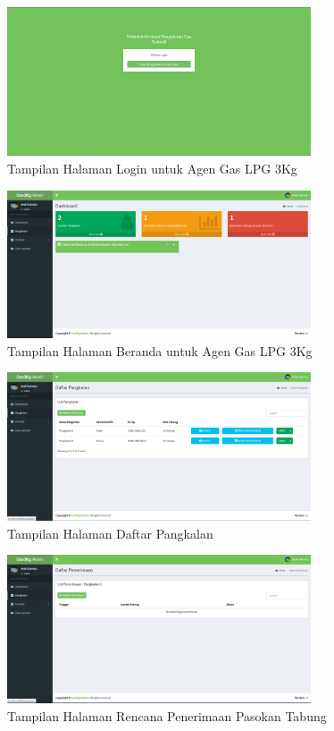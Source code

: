 	\begin{figure}[H]
		\center
		\includegraphics [width = 9cm]{gambar/web/login}
		\caption{Tampilan Halaman Login untuk Agen Gas LPG 3Kg}
		\label{tampilanLoginAgen}
	\end{figure}
	
	\begin{figure}[H]
		\center
		\includegraphics [width = 9cm]{gambar/web/beranda}
		\caption{Tampilan Halaman Beranda untuk Agen Gas LPG 3Kg}
		\label{tampilanBerandaAgen}
	\end{figure}

	\begin{figure}[H]
		\center
		\includegraphics [width = 9cm]{gambar/web/pangkalan}
		\caption{Tampilan Halaman Daftar Pangkalan }
		\label{tampilanDaftarPangkalanAgen}
	\end{figure}

	\begin{figure}[H]
		\center
		\includegraphics [width = 9cm]{gambar/web/penerimaan}
		\caption{Tampilan Halaman Rencana Penerimaan Pasokan Tabung}
		\label{tampilanPenerimaanAgen}
	\end{figure}

